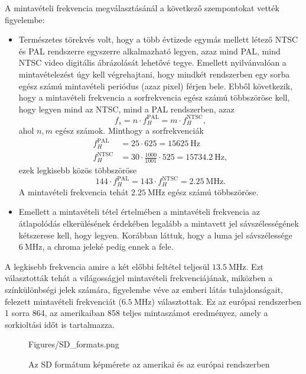 A mintavételi frekvencia megválasztásánál a következő szempontokat vették figyelembe:
\begin{itemize}
\item Természetes törekvés volt, hogy a több évtizede egymás mellett létező NTSC és PAL rendszerre egyszerre alkalmazható legyen, azaz mind PAL, mind NTSC video digitális ábrázolását lehetővé tegye.
Emellett nyilvánvalóan a mintavételezést úgy kell végrehajtani, hogy mindkét rendszerben egy sorba egész számú mintavételi periódus (azaz pixel) férjen bele.
Ebből következik, hogy a mintavételi frekvencia a sorfrekvencia egész számú többszöröse kell, hogy legyen mind az NTSC, mind a PAL rendszerben, azaz
\begin{equation}
f_s = n \cdot f_H^{\mathrm{PAL}} = m \cdot f_H^{\mathrm{NTSC}},
\end{equation}
ahol $n, m$ egész számok.
Minthogy a sorfrekvenciák 
\begin{align}
f_H^{\mathrm{PAL}} &= 25 \cdot 625 = 15625~\mathrm{Hz} \\
f_H^{\mathrm{NTSC}} &= 30 \cdot \frac{1000}{1001} \cdot 525 = 15734.2~\mathrm{Hz} ,
\end{align}
ezek legkisebb közös többszöröse
\begin{equation}
144 \cdot f_H^{\mathrm{PAL}} = 143 \cdot f_H^{\mathrm{NTSC}} = 2.25~\mathrm{MHz}.
\end{equation}
A mintavételi frekvencia tehát $2.25~\mathrm{MHz}$ egész számú többszöröse.
\item Emellett a mintavételi tétel értelmében a mintavételi frekvencia az átlapolódás elkerülésének érdekében legalább a mintavett jel sávszélességének kétszerese kell, hogy legyen.
Korábban láttuk, hogy a luma jel sávszélessége $6~\mathrm{MHz}$, a chroma jeleké pedig ennek a fele.
\end{itemize}
A legkisebb frekvencia amire a két előbbi feltétel teljesül $13.5~\mathrm{MHz}$.
Ezt választották tehát a világosságjel mintavételi frekvenciájának, miközben a színkülönbségi jelek számára, figyelembe véve az emberi látás tulajdonságait, felezett mintavételi frekvenciát ($6.5~\mathrm{MHz}$) választottak.
Ez az európai rendszerben 1 sorra 864, az amerikaiban 858 teljes mintaszámot eredményez, amely a sorkioltási időt is tartalmazza.

\begin{figure}[]
	\centering
	\begin{overpic}[width = 0.65 \columnwidth ]{Figures/SD_formats.png}
	\end{overpic}
	\caption{Az SD formátum képmérete az amerikai és az európai rendszerben}
	\label{Fig:SD_format}
\end{figure}

